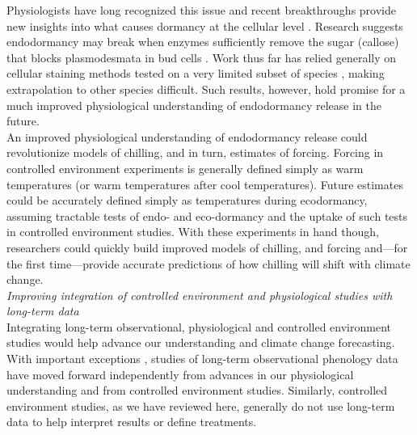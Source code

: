\documentclass[11pt,letter]{article}
\begin{document}
Physiologists have long recognized this issue and recent breakthroughs provide new insights into what causes dormancy at the cellular level \citep{vanderschoot2014}. Research suggests endodormancy may break when enzymes sufficiently remove the sugar (callose) that blocks plasmodesmata in bud cells \citep[reviewed in][]{chang2021}. Work thus far has relied generally on cellular staining methods tested on a very limited subset of species \citep{rinne2011,singh2019}, making extrapolation to other species difficult. Such results, however, hold promise for a much improved physiological understanding of endodormancy release in the future.\\

An improved physiological understanding of endodormancy release could revolutionize models of chilling, and in turn, estimates of forcing. Forcing in controlled environment experiments is generally defined simply as warm temperatures (or warm temperatures after cool temperatures). Future estimates could be accurately defined simply as temperatures during ecodormancy, assuming tractable tests of endo- and eco-dormancy and the uptake of such tests in controlled environment studies. With these experiments in hand though, researchers could quickly build improved models of chilling, and forcing and---for the first time---provide accurate predictions of how chilling will shift with climate change.\\ 

\emph{Improving integration of controlled environment and physiological studies with long-term data}\\
Integrating long-term observational, physiological and controlled environment studies would help advance our understanding and climate change forecasting. With important exceptions \citep[e.g.,][]{gauzere2017}, studies of long-term observational phenology data have moved forward independently from advances in our physiological understanding and from controlled environment studies. Similarly, controlled environment studies, as we have reviewed here, generally do not use long-term data to help interpret results or define treatments. \\
\end{document}
